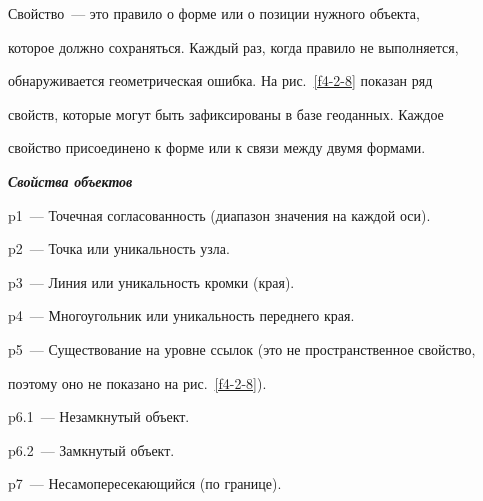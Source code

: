     


    Свойство~--- это правило о форме или о позиции нужного объекта, 


которое должно сохраняться. Каждый раз, когда правило не выполняется, 


обнаруживается геометрическая ошибка. На рис.~\ref{f4-2-8} показан ряд 


свойств, которые могут быть зафиксированы в базе геоданных. Каждое 


свойство присоединено к форме или к связи между двумя формами.





\smallskip





{\bfseries\textit{Свойства объектов}}





\smallskip





 p1~--- Точечная согласованность (диапазон значения на каждой оси). 





     p2~--- Точка или уникальность узла. 





     p3~--- Линия или уникальность кромки (края). 





     p4~---  Многоугольник или уникальность переднего края. 





 p5~---  Существование на уровне ссылок (это не пространственное свойство, 


поэтому оно не показано на рис.~\ref{f4-2-8}). 





p6.1~--- Незамкнутый объект.





 p6.2~--- Замкнутый объект. 





     p7~---  Несамопересекающийся (по границе). 





